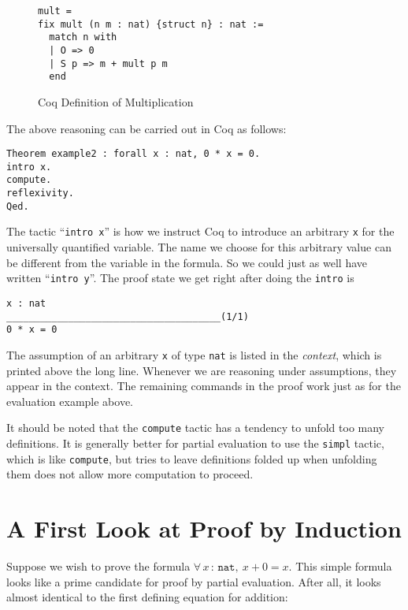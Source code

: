 \documentclass{book}[12pt]
\begin{document}
\begin{figure}
\begin{verbatim}
mult = 
fix mult (n m : nat) {struct n} : nat :=
  match n with
  | O => 0
  | S p => m + mult p m
  end
\end{verbatim}
\caption{\label{fig:mult}Coq Definition of Multiplication}
\end{figure}

The above reasoning can be carried out in Coq as follows:

\begin{verbatim}
Theorem example2 : forall x : nat, 0 * x = 0.
intro x.
compute.
reflexivity.
Qed.
\end{verbatim}

\noindent The tactic ``\texttt{intro x}'' is how we instruct Coq to
introduce an arbitrary \texttt{x} for the universally quantified
variable.  The name we choose for this arbitrary value can be
different from the variable in the formula.  So we could just as
well have written ``\texttt{intro y}''.  The proof state we get right
after doing the \texttt{intro} is 

\begin{verbatim}
x : nat
______________________________________(1/1)
0 * x = 0
\end{verbatim}

\noindent The assumption of an arbitrary \texttt{x} of type
\texttt{nat} is listed in the \emph{context}, which is printed above
the long line.  Whenever we are reasoning under assumptions, they
appear in the context.  The remaining commands in the proof work just
as for the evaluation example above.

It should be noted that the \texttt{compute} tactic has a tendency to
unfold too many definitions.  It is generally better for partial
evaluation to use the \texttt{simpl} tactic, which is like
\texttt{compute}, but tries to leave definitions folded up when
unfolding them does not allow more computation to proceed.

\section{A First Look at Proof by Induction}

Suppose we wish to prove the formula $\forall\, x\, :\, \texttt{nat},\
x + 0 = x$.  This simple formula looks like a prime candidate for
proof by partial evaluation.  After all, it looks almost identical to
the first defining equation for addition:
\end{document}
